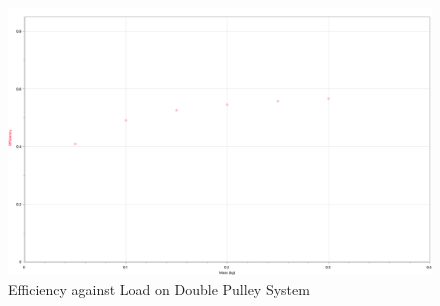 \documentclass[12pt,a4paper]{article}
\begin{document}
\begin{spacing}{1.25}
\begin{figure}[!htbp]
    \centering
    \includegraphics[width = 15cm]{graph2.png}
    \caption{Efficiency against Load on Double Pulley System}
\end{figure}
\end{spacing}
\end{document}
